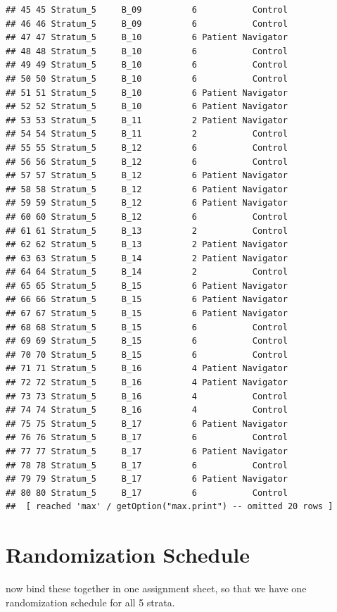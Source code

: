 \documentclass[
]{book}
\begin{document}
\begin{verbatim}
## 45 45 Stratum_5     B_09          6           Control
## 46 46 Stratum_5     B_09          6           Control
## 47 47 Stratum_5     B_10          6 Patient Navigator
## 48 48 Stratum_5     B_10          6           Control
## 49 49 Stratum_5     B_10          6           Control
## 50 50 Stratum_5     B_10          6           Control
## 51 51 Stratum_5     B_10          6 Patient Navigator
## 52 52 Stratum_5     B_10          6 Patient Navigator
## 53 53 Stratum_5     B_11          2 Patient Navigator
## 54 54 Stratum_5     B_11          2           Control
## 55 55 Stratum_5     B_12          6           Control
## 56 56 Stratum_5     B_12          6           Control
## 57 57 Stratum_5     B_12          6 Patient Navigator
## 58 58 Stratum_5     B_12          6 Patient Navigator
## 59 59 Stratum_5     B_12          6 Patient Navigator
## 60 60 Stratum_5     B_12          6           Control
## 61 61 Stratum_5     B_13          2           Control
## 62 62 Stratum_5     B_13          2 Patient Navigator
## 63 63 Stratum_5     B_14          2 Patient Navigator
## 64 64 Stratum_5     B_14          2           Control
## 65 65 Stratum_5     B_15          6 Patient Navigator
## 66 66 Stratum_5     B_15          6 Patient Navigator
## 67 67 Stratum_5     B_15          6 Patient Navigator
## 68 68 Stratum_5     B_15          6           Control
## 69 69 Stratum_5     B_15          6           Control
## 70 70 Stratum_5     B_15          6           Control
## 71 71 Stratum_5     B_16          4 Patient Navigator
## 72 72 Stratum_5     B_16          4 Patient Navigator
## 73 73 Stratum_5     B_16          4           Control
## 74 74 Stratum_5     B_16          4           Control
## 75 75 Stratum_5     B_17          6 Patient Navigator
## 76 76 Stratum_5     B_17          6           Control
## 77 77 Stratum_5     B_17          6 Patient Navigator
## 78 78 Stratum_5     B_17          6           Control
## 79 79 Stratum_5     B_17          6 Patient Navigator
## 80 80 Stratum_5     B_17          6           Control
##  [ reached 'max' / getOption("max.print") -- omitted 20 rows ]
\end{verbatim}

\hypertarget{randomization-schedule}{%
\section{Randomization Schedule}\label{randomization-schedule}}

now bind these together in one assignment sheet,
so that we have one randomization schedule for all 5 strata.
\end{document}
